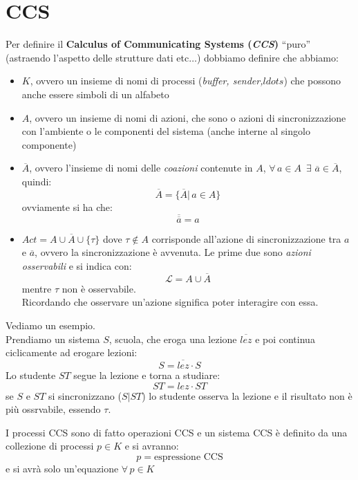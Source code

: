 \section{CCS}
\begin{definizione}
  Per definire il \textbf{Calculus of Communicating Systems (\textit{CCS})}
  ``puro'' (astraendo l'aspetto delle strutture dati etc$\ldots$) dobbiamo
  definire che abbiamo: 
  \begin{itemize}
    \item $K$, ovvero un insieme di nomi di processi (\textit{buffer,
      sender,$ldots$}) che possono anche essere simboli di un alfabeto
    \item $A$, ovvero un insieme di nomi di azioni, che sono o azioni di
    sincronizzazione con l'ambiente o le componenti del sistema (anche interne
    al singolo componente)
    \item $\overline{A}$, ovvero l'insieme di nomi delle \textit{coazioni}
    contenute in $A$, $\forall\, a\in A\,\,\,\exists\,\, \overline{a}\in
    \overline{A}$, quindi:
    \[\overline{A}=\{\overline{A}|\, a\in A\}\]
    ovviamente si ha che:
    \[\overline{\overline{a}}=a\]
    \item $Act=A\cup \overline{A}\cup \{\tau\}$ dove $\tau\not\in A$ corrisponde
    all'azione di sincronizzazione tra $a$ e $\overline{a}$, ovvero la
    sincronizzazione è avvenuta. Le prime due sono \textit{azioni osservabili} e
    si indica con:
    \[\mathcal{L}=A\cup \overline{A}\]
    mentre $\tau$ non è osservabile.\\
    Ricordando che osservare un'azione significa poter interagire con essa.
  \end{itemize}
\end{definizione}
\begin{esempio}
  Vediamo un esempio.\\
  Prendiamo un sistema $S$, scuola, che eroga una lezione $\overline{lez}$ e poi
  continua ciclicamente ad erogare lezioni:
  \[S=\overline{lez}\cdot S\]
  Lo studente $ST$ segue la lezione e torna a studiare:
  \[ST=lez\cdot ST\] 
  se $S$ e $ST$ si sincronizzano ($S|ST$) lo studente osserva la lezione e il
  risultato non è più ossrvabile, essendo $\tau$.
\end{esempio}
\begin{definizione}
  I processi CCS sono di fatto operazioni CCS e un sistema CCS è definito da una
  collezione di processi $p\in K$ e si avranno:
  \[p=\mbox{espressione CCS}\]
  e si avrà solo un'equazione $\forall\, p\in K$
\end{definizione}

